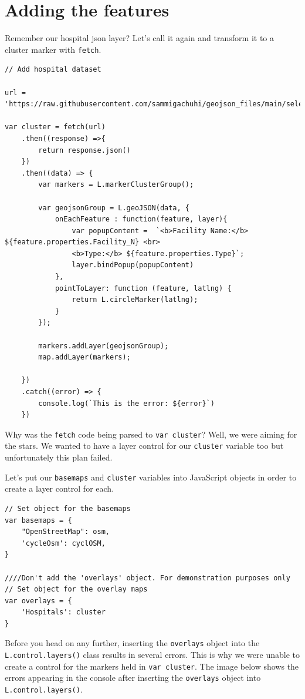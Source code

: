 \documentclass[
]{book}
\begin{document}
\hypertarget{adding-the-features}{%
\section{Adding the features}\label{adding-the-features}}

Remember our hospital json layer? Let's call it again and transform it to a cluster marker with \texttt{fetch}.

\begin{verbatim}
// Add hospital dataset

url = 'https://raw.githubusercontent.com/sammigachuhi/geojson_files/main/selected_hospitals.json'

var cluster = fetch(url)
    .then((response) =>{
        return response.json()
    })
    .then((data) => {
        var markers = L.markerClusterGroup();

        var geojsonGroup = L.geoJSON(data, {
            onEachFeature : function(feature, layer){
                var popupContent =  `<b>Facility Name:</b> ${feature.properties.Facility_N} <br>
                <b>Type:</b> ${feature.properties.Type}`;
                layer.bindPopup(popupContent)
            },
            pointToLayer: function (feature, latlng) {
                return L.circleMarker(latlng);
            }
        });

        markers.addLayer(geojsonGroup);
        map.addLayer(markers);

    })
    .catch((error) => {
        console.log(`This is the error: ${error}`)
    })
\end{verbatim}

Why was the \texttt{fetch} code being parsed to \texttt{var\ cluster}? Well, we were aiming for the stars. We wanted to have a layer control for our \texttt{cluster} variable too but unfortunately this plan failed.

Let's put our \texttt{basemaps} and \texttt{cluster} variables into JavaScript objects in order to create a layer control for each.

\begin{verbatim}
// Set object for the basemaps
var basemaps = {
    "OpenStreetMap": osm,
    'cycleOsm': cyclOSM,
}

////Don't add the 'overlays' object. For demonstration purposes only
// Set object for the overlay maps
var overlays = {
    'Hospitals': cluster
}
\end{verbatim}

Before you head on any further, inserting the \texttt{overlays} object into the \texttt{L.control.layers()} class results in several errors. This is why we were unable to create a control for the markers held in \texttt{var\ cluster}. The image below shows the errors appearing in the console after inserting the \texttt{overlays} object into \texttt{L.control.layers()}.
\end{document}

